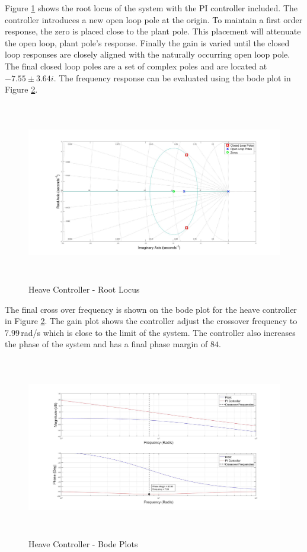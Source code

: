 	 Figure \ref{IM_HeaveControlRoot} shows the root locus of the system with the PI controller included. The controller introduces a new open loop pole at the origin. To maintain a first order response, the zero is placed close to the plant pole. This placement will attenuate the open loop, plant pole's response. Finally the gain is varied until the closed loop responses are closely aligned with the naturally occurring open loop pole. The final closed loop poles are a set of complex poles and are located at $-7.55 \pm 3.64 i$. The frequency response can be evaluated using the bode plot in Figure \ref{IM_HeaveControlBode}. 
	 
	 \begin{figure}[H]
	 	\centering
	 	\includegraphics[height = 7.9cm]{../Design/Matlab/Controllers/heave_root.jpg}
	 	\caption{Heave Controller -  Root Locus}
	 	\label{IM_HeaveControlRoot}
	 \end{figure}
	 
	 The final cross over frequency is shown on the bode plot for the heave controller in Figure \ref{IM_HeaveControlBode}. The gain plot shows the controller adjust the crossover frequency to $7.99$\,rad/s which is close to the limit of the system. The controller also increases the phase of the system and has a final phase margin of $84$\textdegree.
	 
	 \begin{figure}[H]
	 	\centering
	 	\includegraphics[height = 7.9cm]{../Design/Matlab/Controllers/heave_bode.jpg}
	 	\caption{Heave Controller -  Bode Plots}
	 	\label{IM_HeaveControlBode}
	 \end{figure}
	 
